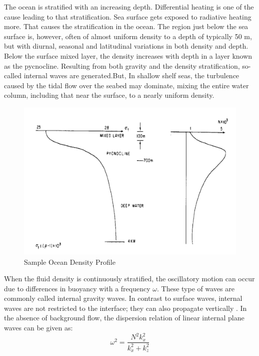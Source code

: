 \documentclass[12pt]{report}
\begin{document}
      The ocean is stratified  with an increasing depth. Differential heating is one of the cause leading to that stratification. Sea surface gets exposed to radiative heating more. That causes the stratification in the ocean. The region just below the sea surface is, however, often of almost uniform density to a depth of typically 50 m, but with diurnal, seasonal and latitudinal variations in both density and depth\cite{ThorpeBook}. Below the surface mixed layer, the density increases with depth in a layer known as the pycnocline. Resulting from both gravity and the density stratification, so-called internal waves are generated.But, In  shallow shelf seas, the turbulence caused by the tidal flow over the seabed may dominate, mixing the entire water column, including that near the surface, to a nearly uniform density\cite{ThorpeBook}.
      \begin{figure}[h!]
  \centering
    
    \includegraphics[scale=0.4]{OceanPro.png}   
  \caption{Sample Ocean Density Profile}
           
\end{figure}
When the fluid density is continuously stratified, the oscillatory motion can occur due to differences in buoyancy \cite{LightHillBook} with a frequency $\omega$. These type of waves are commonly called internal gravity waves. In contrast to surface waves, internal waves are not restricted to the interface; they can also propagate vertically \cite{SutherlandBook,LightHillBook}. In the absence of background flow, the dispersion relation of linear internal plane waves can be given as:
 \begin{equation}
 \label{eq:0}
 \omega^2=\frac{N^2 k_{x}^2}{k_{x}^2+k_{z}^2}
\end{equation} 
\end{document}
